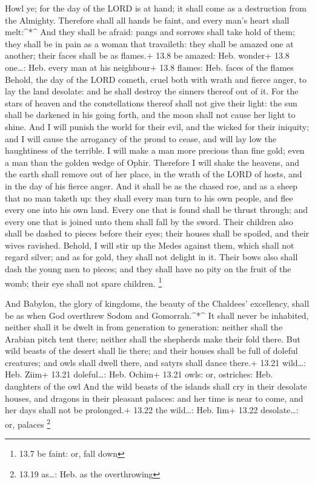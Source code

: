  Howl ye; for the day of the LORD is at hand; it shall come
as a destruction from the Almighty.  Therefore shall all
hands be faint, and every man's heart shall melt:\^{}*\^{} 
And they shall be afraid: pangs and sorrows shall take hold of them;
they shall be in pain as a woman that travaileth: they shall be amazed
one at another; their faces shall be as flames.+ 13.8 be amazed: Heb.
wonder+ 13.8 one\ldots: Heb. every man at his neighbour+ 13.8 flames:
Heb. faces of the flames  Behold, the day of the LORD
cometh, cruel both with wrath and fierce anger, to lay the land
desolate: and he shall destroy the sinners thereof out of it.
 For the stars of heaven and the constellations thereof
shall not give their light: the sun shall be darkened in his going
forth, and the moon shall not cause her light to shine. 
And I will punish the world for their evil, and the wicked for their
iniquity; and I will cause the arrogancy of the proud to cease, and will
lay low the haughtiness of the terrible.  I will make a man
more precious than fine gold; even a man than the golden wedge of Ophir.
 Therefore I will shake the heavens, and the earth shall
remove out of her place, in the wrath of the LORD of hosts, and in the
day of his fierce anger.  And it shall be as the chased
roe, and as a sheep that no man taketh up: they shall every man turn to
his own people, and flee every one into his own land. 
Every one that is found shall be thrust through; and every one that is
joined unto them shall fall by the sword.  Their children
also shall be dashed to pieces before their eyes; their houses shall be
spoiled, and their wives ravished.  Behold, I will stir up
the Medes against them, which shall not regard silver; and as for gold,
they shall not delight in it.  Their bows also shall dash
the young men to pieces; and they shall have no pity on the fruit of the
womb; their eye shall not spare children. \footnote{13.7 be faint: or,
  fall down}

 And Babylon, the glory of kingdoms, the beauty of the
Chaldees' excellency, shall be as when God overthrew Sodom and
Gomorrah.\^{}*\^{}  It shall never be inhabited, neither
shall it be dwelt in from generation to generation: neither shall the
Arabian pitch tent there; neither shall the shepherds make their fold
there.  But wild beasts of the desert shall lie there; and
their houses shall be full of doleful creatures; and owls shall dwell
there, and satyrs shall dance there.+ 13.21 wild\ldots: Heb. Ziim+ 13.21
doleful\ldots: Heb. Ochim+ 13.21 owls: or, ostriches: Heb. daughters of
the owl  And the wild beasts of the islands shall cry in
their desolate houses, and dragons in their pleasant palaces: and her
time is near to come, and her days shall not be prolonged.+ 13.22 the
wild\ldots: Heb. Iim+ 13.22 desolate\ldots: or, palaces \footnote{13.19
  as\ldots: Heb. as the overthrowing}

